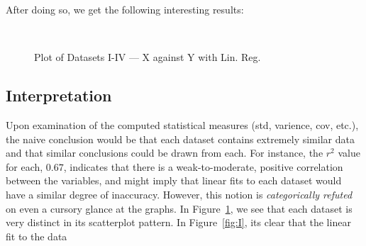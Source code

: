 \documentclass[11pt,a4paper]{article}
\begin{document}
After doing so, we get the following interesting results:

\begin{figure}[htbp]
\centering
{}\qquad
{}\\
\qquad%
%
\caption{Plot of Datasets I-IV — X against Y with Lin. Reg.}
\label{fig:1}
\end{figure}

\subsection{Interpretation}

Upon examination of the computed statistical measures (std, varience, cov, etc.), the naive conclusion would be that each dataset contains extremely similar data and that similar conclusions could be drawn from each. For instance, the $r^2$ value for each, $0.67$, indicates that there is a weak-to-moderate, positive correlation between the variables, and might imply that linear fits to each dataset would have a similar degree of inaccuracy. However, this notion is \textit{categorically refuted} on even a cursory glance at the graphs. In Figure~\ref{fig:1}, we see that each dataset is very distinct in its scatterplot pattern. In Figure~\ref{fig:I}, its clear that the linear fit to the data 
\end{document}
